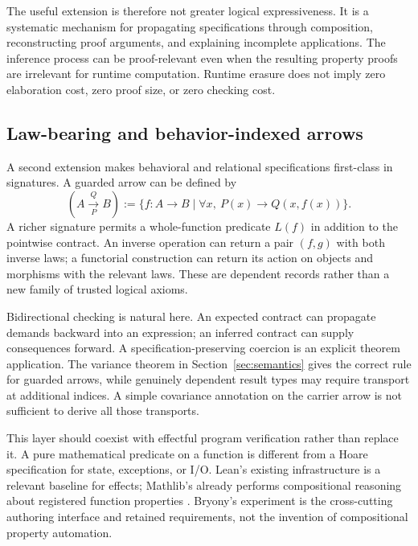 \documentclass[11pt,a4paper]{article}
\newcommand{\code}[1]{\texttt{\detokenize{#1}}}
\theoremstyle{definition}\newtheorem{definition}[theorem]{Definition}
\theoremstyle{remark}\newtheorem{remark}[theorem]{Remark}
\begin{document}
The useful extension is therefore not greater logical expressiveness. It is a systematic mechanism for propagating specifications through composition, reconstructing proof arguments, and explaining incomplete applications. The inference process can be proof-relevant even when the resulting property proofs are irrelevant for runtime computation. Runtime erasure does not imply zero elaboration cost, zero proof size, or zero checking cost.

\subsection{Law-bearing and behavior-indexed arrows}
A second extension makes behavioral and relational specifications first-class in signatures. A guarded arrow can be defined by
\[
 (A\xrightarrow[P]{Q}B)
 :=\{f:A\to B\mid\forall x,\ P(x)\to Q(x,f(x))\}.
\]
A richer signature permits a whole-function predicate $L(f)$ in addition to the pointwise contract. An inverse operation can return a pair $(f,g)$ with both inverse laws; a functorial construction can return its action on objects and morphisms with the relevant laws. These are dependent records rather than a new family of trusted logical axioms.

Bidirectional checking is natural here. An expected contract can propagate demands backward into an expression; an inferred contract can supply consequences forward. A specification-preserving coercion is an explicit theorem application. The variance theorem in Section~\ref{sec:semantics} gives the correct rule for guarded arrows, while genuinely dependent result types may require transport at additional indices. A simple covariance annotation on the carrier arrow is not sufficient to derive all those transports.

This layer should coexist with effectful program verification rather than replace it. A pure mathematical predicate on a function is different from a Hoare specification for state, exceptions, or I/O. Lean's existing \code{mvcgen} infrastructure is a relevant baseline for effects; Mathlib's \code{fun_prop} already performs compositional reasoning about registered function properties \cite{mvcgen,funprop}. Bryony's experiment is the cross-cutting authoring interface and retained requirements, not the invention of compositional property automation.
\end{document}
